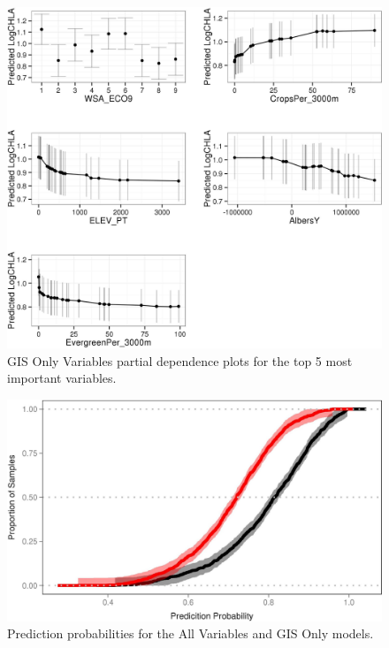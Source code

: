 \documentclass[11pt,]{article}
\begin{document}
\begin{figure}[htbp]
\centering
\includegraphics{manuscript_files/figure-latex/gis_partial_dependence-1.jpeg}
\caption{GIS Only Variables partial dependence plots for the top 5 most
important variables. \label{fig:gis_partial_dependence}}
\end{figure}

\newpage

\begin{figure}[htbp]
\centering
\includegraphics{manuscript_files/figure-latex/unnamed-chunk-1-1.jpeg}
\caption{Prediction probabilities for the All Variables and GIS Only
models. \label{fig:prob_cdf}}
\end{figure}
\end{document}
